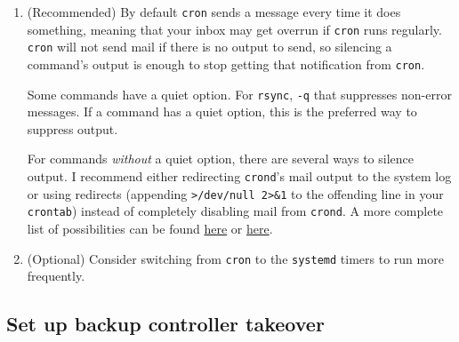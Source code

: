 \begin{enumerate}

  \item \label{item:cronNoMail} (Recommended) By default \texttt{cron} sends a message every time it does something, meaning that your inbox may get overrun if \texttt{cron} runs regularly. \texttt{cron} will not send mail if there is no output to send, so silencing a command's output is enough to stop getting that notification from \texttt{cron}.

    Some commands have a quiet option. For \texttt{rsync}, \texttt{-q} that suppresses non-error messages. If a command has a quiet option, this is the preferred way to suppress output.

    For commands \emph{without} a quiet option, there are several ways to silence output. I recommend either redirecting \texttt{crond}'s mail output to the system log or using redirects (appending \texttt{>/dev/null 2>\&1} to the offending line in your \texttt{crontab}) instead of completely disabling mail from \texttt{crond}. A more complete list of possibilities can be found \href{https://www.putorius.net/stop-cron-daemon-from-sending-email-for.html}{here} or \href{http://www.auxnet.org/index.php/the-news/228-stop-cron-daemon-from-sending-email-for-each-job}{here}. 

  \item (Optional) Consider switching from \texttt{cron} to the \texttt{systemd} timers to run more frequently.
\end{enumerate}

\subsection{Set up backup controller takeover} \label{subsec:SetupBackupTakeover}

